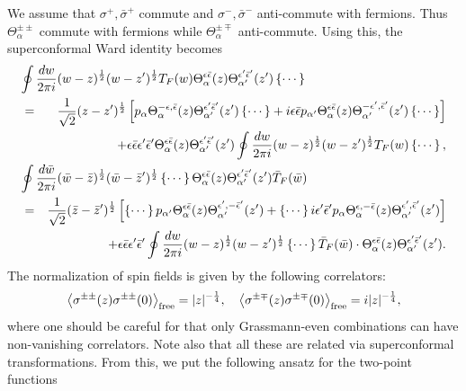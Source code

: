 \documentclass[a4paper,12pt]{article}
\newcommand{\vev}[1]{\left<{#1}\right>}
\newcommand{\ep}{{\epsilon}}
\newcommand{\bep}{{\bar{\epsilon}}}
\begin{document}
 We assume that $\sigma^+,\bar{\sigma}^+$ commute and
 $\sigma^-,\bar{\sigma}^-$ anti-commute with fermions.
 Thus $\Theta_\alpha^{\pm\pm}$ commute with fermions while
 $\Theta_\alpha^{\pm\mp}$ anti-commute.
 Using this, the superconformal Ward identity becomes
\begin{eqnarray}
\lefteqn{
  \oint\frac{dw}{2\pi i}(w-z)^{\frac{1}{2}}(w-z')^{\frac{1}{2}}T_F(w)
  \Theta_{\alpha }^{\ep\bep}(z)
  \Theta_{\alpha'}^{\ep'\bep'}(z')\left\{\cdots\right\}
} \nonumber \\
 &=& \frac{1}{\sqrt{2}}(z-z')^{\frac{1}{2}}
    \left[p_{\alpha}
    \Theta_{\alpha}^{-\ep,\bep}(z)
    \Theta_{\alpha'}^{\ep'\bep'}(z')\left\{\cdots\right\}
  +i\ep\bep p_{\alpha'}
    \Theta_{\alpha}^{\ep\bep}(z)
    \Theta_{\alpha'}^{-\ep',\bep'}(z')\left\{\cdots\right\}\right]
   \nonumber \\
 & &+\ep\bep\ep'\bep'
    \Theta_{\alpha}^{\ep\bep}(z)
    \Theta_{\alpha'}^{\ep'\bep'}(z')
    \oint\frac{dw}{2\pi i}(w-z)^{\frac{1}{2}}(w-z')^{\frac{1}{2}}
     T_F(w)\left\{\cdots\right\},
   \nonumber \\
\lefteqn{
  \oint\frac{d\bar{w}}{2\pi i}(\bar{w}-\bar{z})^{\frac{1}{2}}
 (\bar{w}-\bar{z}')^{\frac{1}{2}}
  \left\{\cdots\right\}\Theta_{\alpha }^{\ep\bep}(z)
       \Theta_{\alpha'}^{\ep'\bep'}(z')\bar{T}_F(\bar{w})
} \nonumber \\
 &=& \frac{1}{\sqrt{2}}(\bar{z}-\bar{z}')^{\frac{1}{2}}
    \left[\left\{\cdots\right\} p_{\alpha'}
    \Theta_{\alpha}^{\ep\bep}(z)
    \Theta_{\alpha'}^{\ep',-\bep'}(z')
  + \left\{\cdots\right\}i\ep'\bep' p_{\alpha}
    \Theta_{\alpha}^{\ep,-\bep}(z)
    \Theta_{\alpha'}^{\ep',\bep'}(z')\right] \nonumber \\
 & &+\ep\bep\ep'\bep'
    \oint\frac{dw}{2\pi i}(w-z)^{\frac{1}{2}}(w-z')^{\frac{1}{2}}
    \left\{\cdots\right\}\bar{T}_F(\bar{w})\cdot
    \Theta_{\alpha}^{\ep\bep}(z)
    \Theta_{\alpha'}^{\ep'\bep'}(z').
\end{eqnarray}
 The normalization of spin fields is given by the following
 correlators:
\begin{equation}
  \vev{\sigma^{\pm\pm}(z)\sigma^{\pm\pm}(0)}_{\rm free}
 =|z|^{-\frac{1}{4}},~~~
  \vev{\sigma^{\pm\mp}(z)\sigma^{\pm\mp}(0)}_{\rm free}
 =i|z|^{-\frac{1}{4}},
\label{ss}
\end{equation}
 where one should be careful for that only Grassmann-even combinations
 can have non-vanishing correlators.
 Note also that all these are related via superconformal transformations.
 From this, we put the following ansatz for the two-point functions
\end{document}
